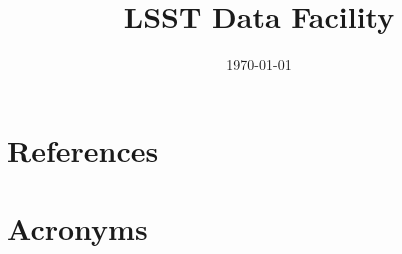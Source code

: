 \documentclass[modern]{aastex62}
\begin{document}

\date{\today}
\title{LSST Data Facility}





\appendix

\section{References} \label{sec:bib}



\section{Acronyms} \label{sec:acronyms}

\end{document}
